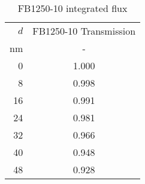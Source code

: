 \begin{table}[h!]
\caption{FB1250-10 integrated flux \label{tbl_FB1250}}
\begin{center}
    \begin{tabular}{ r c}
    \hline
    $d$ & FB1250-10 Transmission\\
    nm  & - \\
    \hline
      0 &                   1.000 \\
      8 &                   0.998 \\
     16 &                   0.991 \\
     24 &                   0.981 \\
     32 &                   0.966 \\
     40 &                   0.948 \\
     48 &                   0.928 \\
    \hline
    \end{tabular}
\end{center}
\end{table}